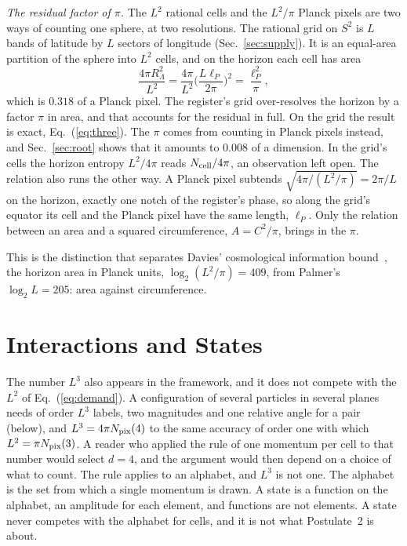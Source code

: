 \documentclass[aps,prd,twocolumn,superscriptaddress,nofootinbib]{revtex4-2}
\begin{document}
\textit{The residual factor of $\pi$.} The $L^2$ rational cells and the $L^2/\pi$ Planck pixels are two ways of counting one sphere, at two resolutions. The rational grid on $S^2$ is $L$ bands of latitude by $L$ sectors of longitude (Sec.~\ref{sec:supply}). It is an equal-area partition of the sphere into $L^2$ cells, and on the horizon each cell has area
\begin{equation}
\frac{4\pi R_\Lambda^2}{L^2} = \frac{4\pi}{L^2}\Big(\frac{L\ell_P}{2\pi}\Big)^2 = \frac{\ell_P^2}{\pi},
\label{eq:cell}
\end{equation}
which is $0.318$ of a Planck pixel. The register's grid over-resolves the horizon by a factor $\pi$ in area, and that accounts for the residual in full. On the grid the result is exact, Eq.~(\ref{eq:three}). The $\pi$ comes from counting in Planck pixels instead, and Sec.~\ref{sec:root} shows that it amounts to $0.008$ of a dimension. In the grid's cells the horizon entropy $L^2/4\pi$ reads $N_{\rm cell}/4\pi$, an observation left open. The relation also runs the other way. A Planck pixel subtends $\sqrt{4\pi/(L^2/\pi)} = 2\pi/L$ on the horizon, exactly one notch of the register's phase, so along the grid's equator its cell and the Planck pixel have the same length, $\ell_P$. Only the relation between an area and a squared circumference, $A = C^2/\pi$, brings in the $\pi$.

This is the distinction that separates Davies' cosmological information bound~\cite{davies2007}, the horizon area in Planck units, $\log_2(L^2/\pi) = 409$, from Palmer's $\log_2 L = 205$: area against circumference.

\section{Interactions and States}
\label{sec:states}

The number $L^3$ also appears in the framework, and it does not compete with the $L^2$ of Eq.~(\ref{eq:demand}). A configuration of several particles in several planes needs of order $L^3$ labels, two magnitudes and one relative angle for a pair (below), and $L^3 = 4\pi N_{\rm pix}(4)$ to the same accuracy of order one with which $L^2 = \pi N_{\rm pix}(3)$. A reader who applied the rule of one momentum per cell to that number would select $d = 4$, and the argument would then depend on a choice of what to count. The rule applies to an alphabet, and $L^3$ is not one. The alphabet is the set from which a single momentum is drawn. A state is a function on the alphabet, an amplitude for each element, and functions are not elements. A state never competes with the alphabet for cells, and it is not what Postulate~2 is about.
\end{document}
